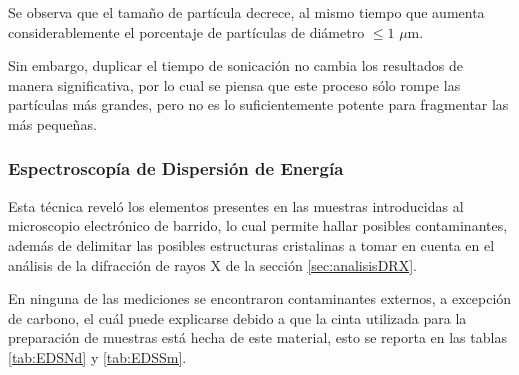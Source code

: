 \documentclass[../main.tex]{subfiles}
\begin{document}
Se observa que el tamaño de partícula decrece, al mismo tiempo que aumenta considerablemente el porcentaje de partículas de diámetro $\leq1$ $\mu$m. 

Sin embargo, duplicar el tiempo de sonicación no cambia los resultados de manera significativa, por lo cual se piensa que este proceso sólo rompe las partículas más grandes, pero no es lo suficientemente potente para fragmentar las más pequeñas.
\subsubsection{Espectroscopía de Dispersión de Energía}
Esta técnica reveló los elementos presentes en las muestras introducidas al microscopio electrónico de barrido, lo cual permite hallar posibles contaminantes, además de delimitar las posibles estructuras cristalinas a tomar en cuenta en el análisis de la difracción de rayos X de la sección \ref{sec:analisisDRX}.

En ninguna de las mediciones se encontraron contaminantes externos, a excepción de carbono, el cuál puede explicarse debido a que la cinta utilizada para la preparación de muestras está hecha de este material, esto se reporta en las tablas \ref{tab:EDSNd} y \ref{tab:EDSSm}.
\end{document}
